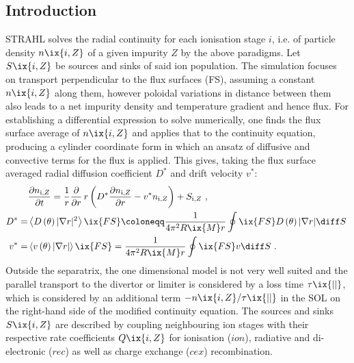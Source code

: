         \subsection{Introduction}\label{subsec:strahl}%
%
            STRAHL solves the radial continuity for each ionisation stage $i$, i.e. of particle density $n\ix{i,Z}$ of a given impurity $Z$ by the above paradigms. Let $S\ix{i,Z}$ be sources and sinks of said ion population. The simulation focuses on transport perpendicular to the flux surfaces (FS), assuming a constant $n\ix{i,Z}$ along them, however poloidal variations in distance between them also leads to a net impurity density and temperature gradient and hence flux. For establishing a differential expression to solve numerically, one finds the flux surface average of $n\ix{i,Z}$ and applies that to the continuity equation, producing a cylinder coordinate form in which an ansatz of diffusive and convective terms for the flux is applied. This gives, taking the flux surface averaged radial diffusion coefficient $D^{\ast}$ and drift velocity $v^{\ast}$:%
%
            \begin{align}%
                \begin{split}\label{eq:strahl_radtrans}%
                    &\frac{\partial n_{\text{i,}Z}}{\partial t}=\frac{1}{r}\frac{\partial}{\partial r}\,r\left(D^{\ast}\frac{\partial n_{\text{i,}Z}}{\partial r}-v^{\ast}n_{\text{i,}Z}\right)+S_{\text{i,}Z}\,\,,\\%
                    D^{\ast}=&\left\langle D\left(\theta\right)\vert \nabla r\vert^{2}\right\rangle\ix{FS}\coloneqq \frac{1}{4\pi^{2}R\ix{M}r}\displaystyle\oint\ix{FS}D\left(\theta\right)\vert\nabla r\vert\diff S\,\,\\%
                    v^{\ast}=&\left\langle v\left(\theta\right)\vert\nabla r\vert\right\rangle\ix{FS}=\frac{1}{4\pi^{2}R\ix{M}r}\displaystyle\oint\ix{FS}v\diff S\,\,.%
                \end{split}%
            \end{align}%
%
            Outside the separatrix, the one dimensional model is not very well suited and the parallel transport to the divertor or limiter is considered by a loss time $\tau\ix{||}$, which is considered by an additional term $-n\ix{i,Z}/\tau\ix{||}$ in the SOL on the right-hand side of the modified continuity equation. The sources and sinks $S\ix{i,Z}$ are described by coupling neighbouring ion stages with their respective rate coefficients $Q\ix{i,Z}$ for ionisation ($ion$), radiative and di-electronic ($rec$) as well as charge exchange ($cex$) recombination.
